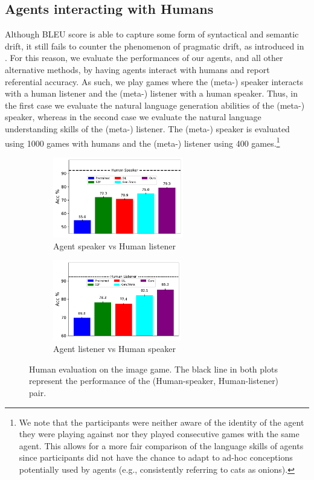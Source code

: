 \documentclass{article}
\begin{document}
\subsection{Agents interacting with Humans}
\label{subsec:human-eval}
Although BLEU score is able to capture some form of syntactical and semantic drift, it still fails to counter the phenomenon of pragmatic drift, as introduced in \citep{lazaridou-etal-2020-multi}. For this reason, we evaluate the performances of our agents, and all other alternative methods, by having agents interact with humans and report referential accuracy. As such, we play games where the (meta-) speaker interacts with a human listener and the (meta-) listener with a human speaker. Thus, in the first case we evaluate the natural language generation abilities of the (meta-) speaker, whereas in the second case we evaluate the natural language understanding skills of the (meta-) listener. The (meta-) speaker is evaluated using 1000 games with humans and the (meta-) listener using 400 games.\footnote{We note that the participants were neither aware of the identity of the agent they were playing against nor they played consecutive games with the same agent. This allows for a more fair comparison of the language skills of agents since participants did not have the chance to adapt to ad-hoc conceptions potentially used by agents (e.g., consistently referring to cats as onions).}
\begin{figure}
    \centering
    \begin{subfigure}{0.34\textwidth}
    \centering
    \includegraphics[width=0.98\linewidth, height=3.5cm]{figs/meta-speaker-human-eval.pdf}
    \caption{Agent speaker vs Human listener}
    \label{fig:meta-speaker-human-image}
    \end{subfigure}
    \hfill
    \begin{subfigure}{0.34\textwidth}
    \centering
    \includegraphics[width=0.98\linewidth, height=3.5cm]{figs/meta-listener-human-eval.pdf}
    \caption{Agent listener vs Human speaker}
    \label{fig:meta-listener-human-image}
    \end{subfigure}
    \caption{Human evaluation on the image game. The black line in both plots represent the performance of the (Human-speaker, Human-listener) pair.}
\end{figure}
\end{document}
